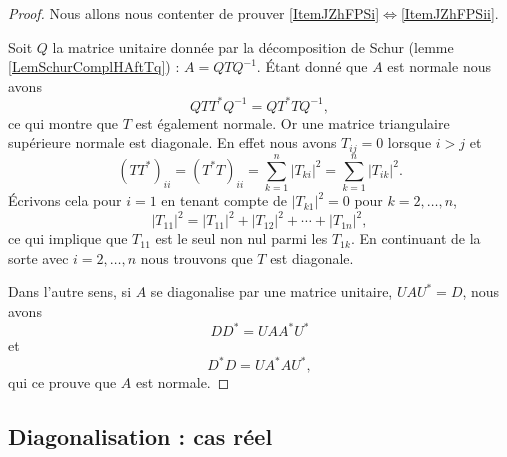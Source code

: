 \begin{proof}
    Nous allons nous contenter de prouver \ref{ItemJZhFPSi}\( \Leftrightarrow\)\ref{ItemJZhFPSii}.

    Soit \( Q\) la matrice unitaire donnée par la décomposition de Schur (lemme \ref{LemSchurComplHAftTq}) : \( A=QTQ^{-1}\). Étant donné que \( A\) est normale nous avons
    \begin{equation}
        QTT^*Q^{-1}=QT^*TQ^{-1},
    \end{equation}
    ce qui montre que \( T\) est également normale. Or une matrice triangulaire supérieure normale est diagonale. En effet nous avons \( T_{ij}=0\) lorsque \( i>j\) et
    \begin{equation}
        (TT^*)_{ii}=(T^*T)_{ii}=\sum_{k=1}^n| T_{ki} |^2=\sum_{k=1}^n| T_{ik} |^2.
    \end{equation}
    Écrivons cela pour \( i=1\) en tenant compte de \( | T_{k1} |^2=0\) pour \( k=2,\ldots, n\),
    \begin{equation}
        | T_{11} |^2=| T_{11} |^2+| T_{12} |^2+\cdots+| T_{1n} |^2,
    \end{equation}
    ce qui implique que \( T_{11}\) est le seul non nul parmi les \( T_{1k}\). En continuant de la sorte avec \( i=2,\ldots, n\) nous trouvons que \( T\) est diagonale.

    Dans l'autre sens, si \( A\) se diagonalise par une matrice unitaire, \( UAU^*=D\), nous avons
    \begin{equation}
        DD^*=UAA^*U^*
    \end{equation}
    et 
    \begin{equation}
        D^*D=UA^*AU^*,
    \end{equation}
    qui ce prouve que \( A\) est normale.
\end{proof}

\subsection{Diagonalisation : cas réel}

